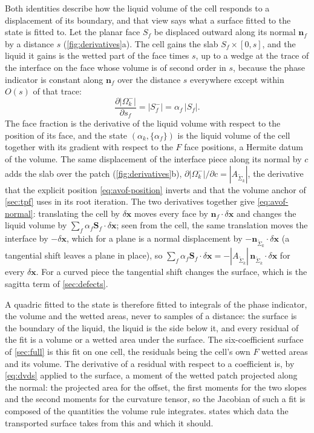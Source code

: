 \documentclass[preprint,12pt]{elsarticle}
\newcommand{\x}{\mathbf{x}}
\newcommand{\n}{\mathbf{n}}
\newcommand{\Sf}{\mathbf{S}_f}
\newcommand{\nSk}{\mathbf{n}_{\tilde{\Sigma}_k}}
\newcommand{\ASk}{A_{\tilde{\Sigma}_k}}
\begin{document}
Both identities describe how the liquid volume of the cell responds to a displacement of its boundary, and that view says what a surface fitted to the state is fitted to. Let the planar face $S_f$ be displaced outward along its normal $\n_f$ by a distance $s$ (\cref{fig:derivatives}a). The cell gains the slab $S_f \times [0, s]$, and the liquid it gains is the wetted part of the face times $s$, up to a wedge at the trace of the interface on the face whose volume is of second order in $s$, because the phase indicator is constant along $\n_f$ over the distance $s$ everywhere except within $O(s)$ of that trace:
\begin{equation}
\frac{\partial |\Omega_k^-|}{\partial s_f} = |S_f^-| = \alpha_f\,|S_f| .
\label{eq:dvds}
\end{equation}
The face fraction is the derivative of the liquid volume with respect to the position of its face, and the state $(\alpha_k, \{\alpha_f\})$ is the liquid volume of the cell together with its gradient with respect to the $F$ face positions, a Hermite datum of the volume. The same displacement of the interface piece along its normal by $c$ adds the slab over the patch (\cref{fig:derivatives}b), $\partial|\Omega_k^-|/\partial c = |\ASk|$, the derivative that the explicit position \cref{eq:avof-position} inverts and that the volume anchor of \cref{sec:tpf} uses in its root iteration. The two derivatives together give \cref{eq:avof-normal}: translating the cell by $\delta\x$ moves every face by $\n_f\cdot\delta\x$ and changes the liquid volume by $\sum_f \alpha_f\Sf\cdot\delta\x$; seen from the cell, the same translation moves the interface by $-\delta\x$, which for a plane is a normal displacement by $-\nSk\cdot\delta\x$ (a tangential shift leaves a plane in place), so $\sum_f \alpha_f\Sf\cdot\delta\x = -|\ASk|\,\nSk\cdot\delta\x$ for every $\delta\x$. For a curved piece the tangential shift changes the surface, which is the sagitta term of \cref{sec:defects}.

A quadric fitted to the state is therefore fitted to integrals of the phase indicator, the volume and the wetted areas, never to samples of a distance: the surface is the boundary of the liquid, the liquid is the side below it, and every residual of the fit is a volume or a wetted area under the surface. The six-coefficient surface of \cref{sec:full} is this fit on one cell, the residuals being the cell's own $F$ wetted areas and its volume. The derivative of a residual with respect to a coefficient is, by \cref{eq:dvds} applied to the surface, a moment of the wetted patch projected along the normal: the projected area for the offset, the first moments for the two slopes and the second moments for the curvature tensor, so the Jacobian of such a fit is composed of the quantities the volume rule integrates.  states which data the transported surface takes from this and which it should.
\end{document}
